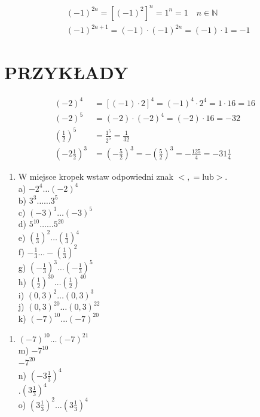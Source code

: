 \documentclass[10pt]{article}
\begin{document}
\[
\begin{aligned}
& (-1)^{2 n}=\left[(-1)^{2}\right]^{n}=1^{n}=1 \quad n \in \mathbb{N} \\
& (-1)^{2 n+1}=(-1) \cdot(-1)^{2 n}=(-1) \cdot 1=-1
\end{aligned}
\]

\section*{PRZYKŁADY}
\[
\begin{aligned}
(-2)^{4} & =[(-1) \cdot 2]^{4}=(-1)^{4} \cdot 2^{4}=1 \cdot 16=16 \\
(-2)^{5} & =(-2) \cdot(-2)^{4}=(-2) \cdot 16=-32 \\
\left(\frac{1}{2}\right)^{5} & =\frac{1^{5}}{2^{5}}=\frac{1}{32} \\
\left(-2 \frac{1}{2}\right)^{3} & =\left(-\frac{5}{2}\right)^{3}=-\left(\frac{5}{2}\right)^{3}=-\frac{125}{4}=-31 \frac{1}{4}
\end{aligned}
\]

\begin{enumerate}
  \item W miejsce kropek wstaw odpowiedni znak \(<,=\mathrm{lub}>\).\\
a) \(-2^{4} \ldots(-2)^{4}\)\\
b) \(3^{3} \ldots \ldots 3^{5}\)\\
c) \((-3)^{3} \ldots(-3)^{5}\)\\
d) \(5^{10} \ldots \ldots 5^{20}\)\\
e) \(\left(\frac{1}{3}\right)^{2} \ldots\left(\frac{1}{3}\right)^{4}\)\\
f) \(-\frac{1}{3} \ldots-\left(\frac{1}{3}\right)^{2}\)\\
g) \(\left(-\frac{1}{3}\right)^{3} \ldots\left(-\frac{1}{3}\right)^{5}\)\\
h) \(\left(\frac{1}{2}\right)^{30} \ldots\left(\frac{1}{2}\right)^{40}\)\\
i) \((0,3)^{2} \ldots(0,3)^{3}\)\\
j) \((0,3)^{20} \ldots(0,3)^{22}\)\\
k) \((-7)^{10} \ldots(-7)^{20}\)
\end{enumerate}

\begin{enumerate}
  \item \((-7)^{10} \ldots(-7)^{21}\)\\
m) \(-7^{10}\)\\
\(-7^{20}\)\\
n) \(\left(-3 \frac{1}{3}\right)^{4}\)\\
.\(\left(3 \frac{1}{3}\right)^{4}\)\\
o) \(\left(3 \frac{1}{3}\right)^{2} \ldots\left(3 \frac{1}{3}\right)^{4}\)
\end{enumerate}
\end{document}
